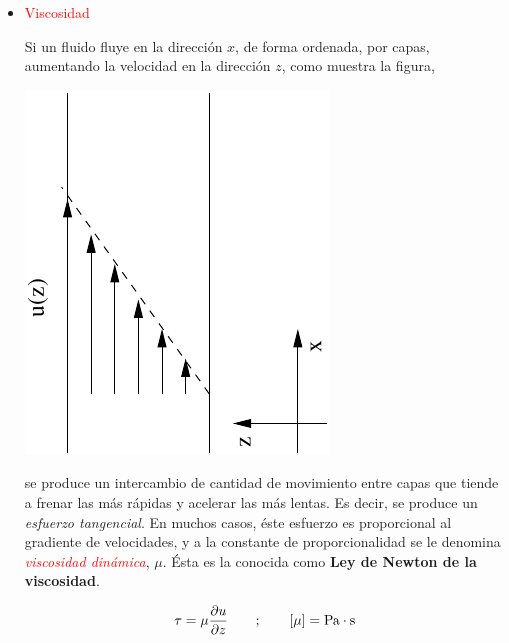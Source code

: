 \begin{itemize}
\begin{itemize}
			\subsection*{Ejercicio} 
			Para el agua, a $20^\circ C$ y presi\'on atmosf\'erica, $\beta_T \approx \unit[2.2\times 10^9]{Pa}$
			y $\rho \approx \unit[1000]{Kg/m^3}$.
			Calcular para qu\'e orden de magnitud de velocidad de flujo el agua debe empezar a considerarse compresible.
		
		\item{\textcolor{red}{Viscosidad}}
		
		Si un fluido fluye en la direcci\'on $x$, de forma ordenada, por capas, aumentando la velocidad en la direcci\'on
		$z$, como muestra la figura,
		
		\begin{center}
			\includegraphics[scale=1,angle=270]{TeX_files/chapter01-Introduccion/u_z.pdf}
		\end{center}
		
		se produce un intercambio de cantidad de movimiento entre capas que tiende a frenar las m\'as r\'apidas y acelerar las m\'as lentas. Es decir, se produce un \textit{esfuerzo tangencial}. En muchos casos, \'este esfuerzo es proporcional al gradiente de velocidades, y a la constante de proporcionalidad se le denomina \textit{\textcolor{red}{viscosidad din\'amica}}, $\mu$. Ésta es la conocida como \textbf{Ley de Newton de la viscosidad}.
		
		\begin{equation}
			\tau = \mu \frac{\partial u}{\partial z} \qquad ; \qquad \left[\mu\right] = \textrm{Pa}\cdot\textrm{s}
		\end{equation}
		

\end{itemize}
\end{itemize}

